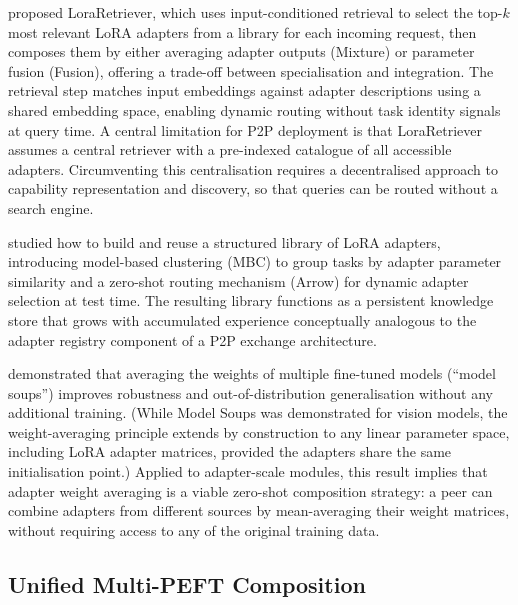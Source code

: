 \citet{ZhaoLoraRetriever2024} proposed LoraRetriever, which uses input-conditioned
retrieval to select the top-$k$ most relevant LoRA adapters from a library for each
incoming request, then composes them by either averaging adapter outputs (Mixture) or
parameter fusion (Fusion), offering a trade-off between specialisation and integration. The retrieval
step matches input embeddings against adapter descriptions using a shared embedding
space, enabling dynamic routing without task identity signals at query time. A central
limitation for P2P deployment is that LoraRetriever assumes a central retriever with a
pre-indexed catalogue of all accessible adapters. Circumventing this centralisation
requires a decentralised approach to capability representation and
discovery, so that queries can be routed without a search engine.

\citet{Ostapenko2024} studied how to build and reuse a structured library of LoRA
adapters, introducing model-based clustering (MBC) to group tasks by adapter parameter
similarity and a zero-shot routing mechanism (Arrow) for dynamic adapter selection at
test time. The resulting library functions as a persistent knowledge store that
grows with accumulated experience conceptually analogous to the adapter registry
component of a P2P exchange architecture.

\citet{Wortsman2022} demonstrated that averaging the weights of multiple fine-tuned
models (``model soups'') improves robustness and out-of-distribution generalisation
without any additional training. (While Model Soups was demonstrated for vision models,
the weight-averaging principle extends by construction to any linear parameter space,
including LoRA adapter matrices, provided the adapters share the same initialisation
point.) Applied to adapter-scale modules, this result implies
that adapter weight averaging is a viable zero-shot composition strategy: a peer can
combine adapters from different sources by mean-averaging their weight matrices,
without requiring access to any of the original training data.

\subsection{Unified Multi-PEFT Composition}
\label{sec:adapter_composition:unified}

